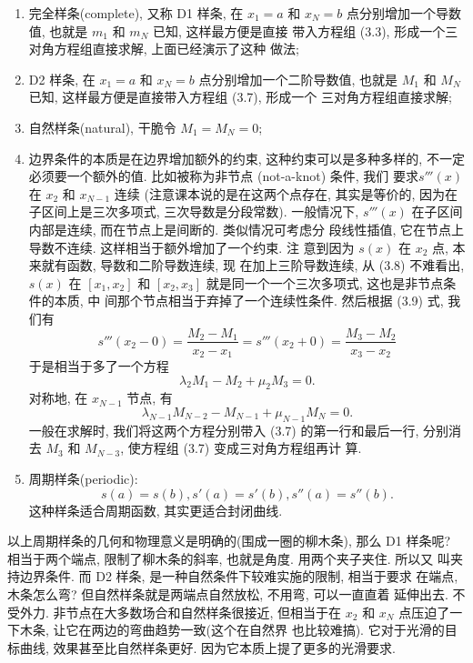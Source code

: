 \documentclass[a4paper]{ctexart}
\begin{document}
{\begin{enumerate}
  \item 完全样条(complete), 又称 D1 样条, 在 $x_1 = a$ 和 $x_N = b$
    点分别增加一个导数值, 也就是 $m_1$ 和 $m_N$ 已知, 这样最方便是直接
    带入方程组 (3.3), 形成一个三对角方程组直接求解, 上面已经演示了这种
    做法;%
  \item D2 样条, 在 $x_1 = a$ 和 $x_N = b$ 点分别增加一个二阶导数值,
    也就是 $M_1$ 和 $M_N$ 已知, 这样最方便是直接带入方程组 (3.7), 形成一个
    三对角方程组直接求解;%
  \item 自然样条(natural), 干脆令 $M_1 = M_N = 0$; 
  \item 边界条件的本质是在边界增加额外的约束, 这种约束可以是多种多样的,
    不一定必须要一个额外的值. 比如被称为非节点 (not-a-knot) 条件, 我们
    要求$s'''(x)$ 在 $x_2$ 和 $x_{N - 1}$ 连续 (注意课本说的是在这两个点存在, 
    其实是等价的, 因为在子区间上是三次多项式, 三次导数是分段常数). 
    一般情况下,
    $s'''(x)$ 在子区间内部是连续, 而在节点上是间断的. 类似情况可考虑分
    段线性插值, 它在节点上导数不连续. 这样相当于额外增加了一个约束. 注
    意到因为 $s(x)$ 在 $x_2$ 点, 本来就有函数, 导数和二阶导数连续, 现
    在加上三阶导数连续, 从 (3.8) 不难看出, $s(x)$ 在 $[x_1, x_2]$ 和
    $[x_2, x_3]$ 就是同一个一个三次多项式, 这也是非节点条件的本质, 中
    间那个节点相当于弃掉了一个连续性条件. 然后根据 (3.9) 式, 我们有
    $$
      s'''(x_2 - 0) = \frac{M_2 - M_1}{x_2 - x_1} =
      s'''(x_2 + 0) = \frac{M_3 - M_2}{x_3 - x_2}
    $$
    于是相当于多了一个方程
    $$
    \lambda_2 M_1 - M_2 + \mu_2 M_3 = 0.
    $$
    对称地, 在 $x_{N - 1}$ 节点, 有
    $$
    \lambda_{N - 1} M_{N - 2} - M_{N - 1} + \mu_{N - 1} M_{N} = 0.
    $$
    一般在求解时, 我们将这两个方程分别带入 (3.7) 的第一行和最后一行,
    分别消去 $M_3$ 和 $M_{N - 3}$, 使方程组 (3.7) 变成三对角方程组再计
    算. 
  \item 周期样条(periodic):
    $$
    s(a) = s(b), s'(a) = s'(b), s''(a) = s''(b).
    $$
    这种样条适合周期函数, 其实更适合封闭曲线. 
\end{enumerate}

以上周期样条的几何和物理意义是明确的(围成一圈的柳木条), 那么 D1 样条呢?
相当于两个端点, 限制了柳木条的斜率, 也就是角度. 用两个夹子夹住. 所以又
叫夹持边界条件. 而 D2 样条, 是一种自然条件下较难实施的限制, 相当于要求
在端点, 木条怎么弯? 但自然样条就是两端点自然放松, 不用弯, 可以一直直着
延伸出去. 不受外力. 非节点在大多数场合和自然样条很接近, 但相当于在
$x_2$ 和 $x_N$ 点压迫了一下木条, 让它在两边的弯曲趋势一致(这个在自然界
也比较难搞). 它对于光滑的目标曲线, 效果甚至比自然样条更好. 
因为它本质上提了更多的光滑要求. 

}
\end{document}
